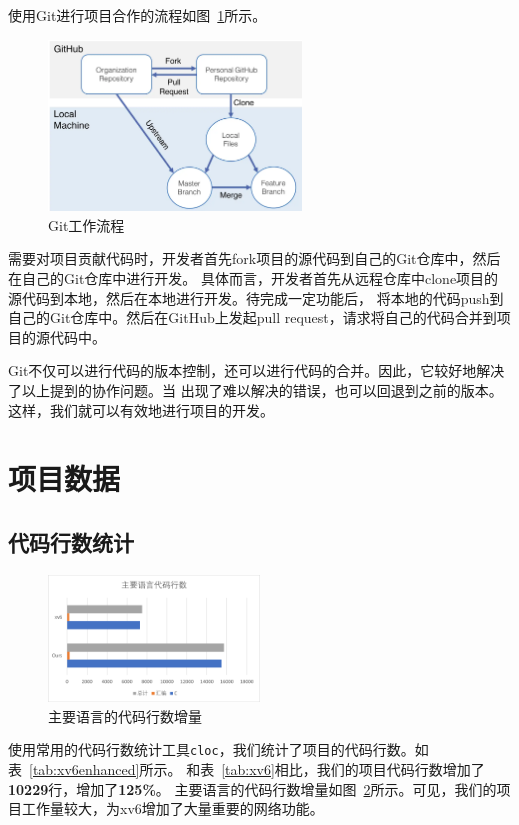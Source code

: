 \documentclass[a4paper,twoside]{ctexrep}
\begin{document}
\begin{spacing}{1.2}
使用Git进行项目合作的流程如图~\ref{fig:gitflow}所示。
\begin{figure}[htb]
	\centering
	\caption{Git工作流程}
	\label{fig:gitflow}
	\includegraphics[width=0.6\textwidth]{git.png}
\end{figure}
需要对项目贡献代码时，开发者首先fork项目的源代码到自己的Git仓库中，然后在自己的Git仓库中进行开发。
具体而言，开发者首先从远程仓库中clone项目的源代码到本地，然后在本地进行开发。待完成一定功能后，
将本地的代码push到自己的Git仓库中。然后在GitHub上发起pull request，请求将自己的代码合并到项目的源代码中。

Git不仅可以进行代码的版本控制，还可以进行代码的合并。因此，它较好地解决了以上提到的协作问题。当
出现了难以解决的错误，也可以回退到之前的版本。这样，我们就可以有效地进行项目的开发。

\clearpage
\section{项目数据}

\subsection{代码行数统计}

\begin{figure}[ht]
	\centering
	\includegraphics[width=0.5\textwidth]{loc.png}
	\caption{主要语言的代码行数增量}
	\label{fig:loc}
\end{figure}
 

使用常用的代码行数统计工具\texttt{cloc}，我们统计了项目的代码行数。如表~\ref{tab:xv6enhanced}所示。
和表~\ref{tab:xv6}相比，我们的项目代码行数增加了\textbf{10229}行，增加了\textbf{125\%}。
主要语言的代码行数增量如图~\ref{fig:loc}所示。可见，我们的项目工作量较大，为xv6增加了大量重要的网络功能。


\end{spacing}
\end{document}

